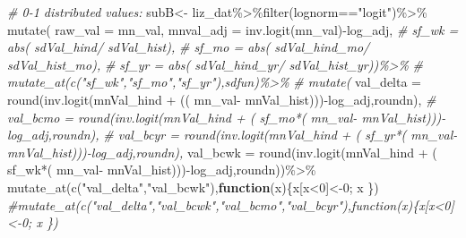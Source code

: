 \documentclass[
]{article}
\newenvironment{Shaded}{\begin{snugshade}}{\end{snugshade}}
\newcommand{\AttributeTok}[1]{\textcolor[rgb]{0.77,0.63,0.00}{#1}}
\newcommand{\CommentTok}[1]{\textcolor[rgb]{0.56,0.35,0.01}{\textit{#1}}}
\newcommand{\ControlFlowTok}[1]{\textcolor[rgb]{0.13,0.29,0.53}{\textbf{#1}}}
\newcommand{\DecValTok}[1]{\textcolor[rgb]{0.00,0.00,0.81}{#1}}
\newcommand{\FunctionTok}[1]{\textcolor[rgb]{0.00,0.00,0.00}{#1}}
\newcommand{\NormalTok}[1]{#1}
\newcommand{\OtherTok}[1]{\textcolor[rgb]{0.56,0.35,0.01}{#1}}
\newcommand{\SpecialCharTok}[1]{\textcolor[rgb]{0.00,0.00,0.00}{#1}}
\newcommand{\StringTok}[1]{\textcolor[rgb]{0.31,0.60,0.02}{#1}}
\begin{document}
\begin{Shaded}
\begin{Highlighting}[]
        \CommentTok{\# 0{-}1 distributed values:}
\NormalTok{        subB}\OtherTok{\textless{}{-}}\NormalTok{ liz\_dat}\SpecialCharTok{\%\textgreater{}\%}\FunctionTok{filter}\NormalTok{(lognorm}\SpecialCharTok{==}\StringTok{"logit"}\NormalTok{)}\SpecialCharTok{\%\textgreater{}\%}
          \FunctionTok{mutate}\NormalTok{(}
          \AttributeTok{raw\_val   =}\NormalTok{ mn\_val,}
          \AttributeTok{mnval\_adj =} \FunctionTok{inv.logit}\NormalTok{(mn\_val)}\SpecialCharTok{{-}}\NormalTok{log\_adj,}
          \CommentTok{\#   sf\_wk  = abs(  sdVal\_hind/  sdVal\_hist),}
          \CommentTok{\#   sf\_mo  = abs(  sdVal\_hind\_mo/  sdVal\_hist\_mo),}
          \CommentTok{\#   sf\_yr  = abs(  sdVal\_hind\_yr/  sdVal\_hist\_yr))\%\textgreater{}\%}
          \CommentTok{\# mutate\_at(c("sf\_wk","sf\_mo","sf\_yr"),sdfun)\%\textgreater{}\%}
          \CommentTok{\# mutate(}
            \AttributeTok{val\_delta =}   \FunctionTok{round}\NormalTok{(}\FunctionTok{inv.logit}\NormalTok{(mnVal\_hind }\SpecialCharTok{+}\NormalTok{ (( mn\_val}\SpecialCharTok{{-}}\NormalTok{  mnVal\_hist)))}\SpecialCharTok{{-}}\NormalTok{log\_adj,roundn),}
            \CommentTok{\# val\_bcmo  =   round(inv.logit(mnVal\_hind + ( sf\_mo*( mn\_val{-} mnVal\_hist))){-}log\_adj,roundn),}
            \CommentTok{\# val\_bcyr  =   round(inv.logit(mnVal\_hind + ( sf\_yr*( mn\_val{-} mnVal\_hist))){-}log\_adj,roundn),}
            \AttributeTok{val\_bcwk  =}   \FunctionTok{round}\NormalTok{(}\FunctionTok{inv.logit}\NormalTok{(mnVal\_hind }\SpecialCharTok{+}\NormalTok{ ( sf\_wk}\SpecialCharTok{*}\NormalTok{( mn\_val}\SpecialCharTok{{-}}\NormalTok{ mnVal\_hist)))}\SpecialCharTok{{-}}\NormalTok{log\_adj,roundn))}\SpecialCharTok{\%\textgreater{}\%}
          \FunctionTok{mutate\_at}\NormalTok{(}\FunctionTok{c}\NormalTok{(}\StringTok{"val\_delta"}\NormalTok{,}\StringTok{"val\_bcwk"}\NormalTok{),}\ControlFlowTok{function}\NormalTok{(x)\{x[x}\SpecialCharTok{\textless{}}\DecValTok{0}\NormalTok{]}\OtherTok{\textless{}{-}}\DecValTok{0}\NormalTok{;  x  \})}
          \CommentTok{\#mutate\_at(c("val\_delta","val\_bcwk","val\_bcmo","val\_bcyr"),function(x)\{x[x\textless{}0]\textless{}{-}0;  x  \})}
    

\end{Highlighting}
\end{Shaded}
\end{document}
